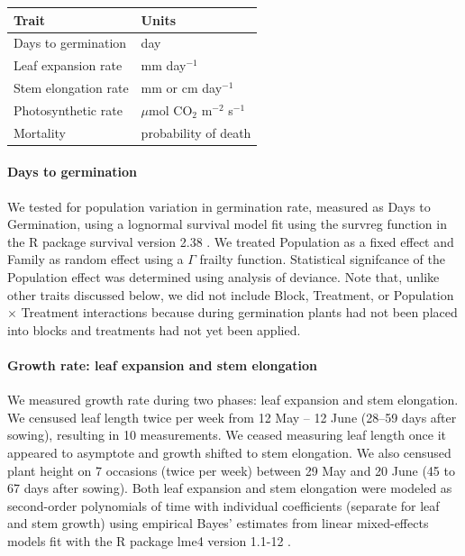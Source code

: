 \documentclass[11pt, oneside]{article}
\newcommand{\pkg}[1]{{\fontseries{b}\selectfont #1}}
\begin{document}
\begin{table}[ht]
   \centering
   \begin{tabular}{@{} ll @{}}
      \toprule
  Trait & Units \\
      \midrule
  Days to germination  & day \\
  Leaf expansion rate  &  mm day$^{-1}$  \\
  Stem elongation rate  &  mm or cm day$^{-1}$  \\
  Photosynthetic rate &  $\mu$mol CO$_2$ m$^{-2}$ s$^{-1}$\\
  Mortality & probability of death  \\
	    \bottomrule
   \end{tabular}
   \label{table:Table_traits}
\end{table}

\paragraph{Days to germination} We tested for population variation in germination rate, measured as Days to Germination, using a lognormal survival model fit using the survreg function in the R package \pkg{survival} version 2.38 \citep{Therneau_2015}. We treated Population as a fixed effect and Family as random effect using a $\Gamma$ frailty function. Statistical signifcance of the Population effect was determined using analysis of deviance. Note that, unlike other traits discussed below, we did not include Block, Treatment, or Population $\times$ Treatment interactions because during germination plants had not been placed into blocks and treatments had not yet been applied.


\paragraph{Growth rate: leaf expansion and stem elongation}

We measured growth rate during two phases: leaf expansion and stem elongation. We censused leaf length twice per week from 12 May -- 12 June (28--59 days after sowing), resulting in 10 measurements. We ceased measuring leaf length once it appeared to asymptote and growth shifted to stem elongation. We also censused plant height on 7 occasions (twice per week) between 29 May and 20 June (45 to 67 days after sowing). Both leaf expansion and stem elongation were modeled as second-order polynomials of time with individual coefficients (separate for leaf and stem growth) using empirical Bayes' estimates from linear mixed-effects models fit with the R package \pkg{lme4} version 1.1-12 \citep{Bates_etal_2015}.
\end{document}
